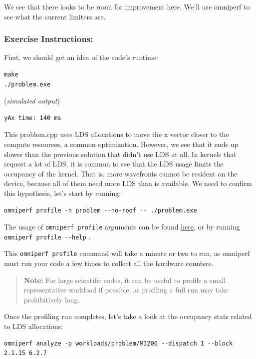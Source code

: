\documentclass[
]{article}
\let\oldtexttt\texttt
\renewcommand{\texttt}[1]{
  \colorbox{Light}{\oldtexttt{#1}}
}
\begin{document}
We see that there looks to be room for improvement here. We'll use
omniperf to see what the current limiters are.

\hypertarget{exercise-instructions2}{%
\subsubsection{Exercise Instructions:}\label{exercise-instructions2}}

First, we should get an idea of the code's runtime:

\begin{verbatim}
make
./problem.exe
\end{verbatim}

(\emph{simulated output})

\begin{verbatim}
yAx time: 140 ms
\end{verbatim}

This problem.cpp uses LDS allocations to move the x vector closer to the
compute resources, a common optimization. However, we see that it ends
up slower than the previous solution that didn't use LDS at all. In
kernels that request a lot of LDS, it is common to see that the LDS
usage limits the occupancy of the kernel. That is, more wavefronts
cannot be resident on the device, because all of them need more LDS than
is available. We need to confirm this hypothesis, let's start by
running:

\begin{verbatim}
omniperf profile -n problem --no-roof -- ./problem.exe
\end{verbatim}

The usage of \texttt{omniperf\ profile} arguments can be found
\href{https://rocm.github.io/omniperf/profiling.html}{here}, or by
running \texttt{omniperf\ profile\ -\/-help}.

This \texttt{omniperf\ profile} command will take a minute or two to
run, as omniperf must run your code a few times to collect all the
hardware counters.

\begin{quote}
\textbf{Note:} For large scientific codes, it can be useful to profile a
small representative workload if possible, as profiling a full run may
take prohibitively long.
\end{quote}

Once the profiling run completes, let's take a look at the occupancy
stats related to LDS allocations:

\begin{verbatim}
omniperf analyze -p workloads/problem/MI200 --dispatch 1 --block 2.1.15 6.2.7
\end{verbatim}
\end{document}
